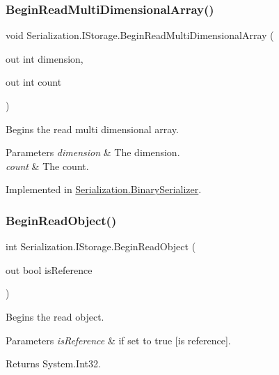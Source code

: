 \subsubsection{\texorpdfstring{Begin\+Read\+Multi\+Dimensional\+Array()}{BeginReadMultiDimensionalArray()}}
{\footnotesize\ttfamily void Serialization.\+I\+Storage.\+Begin\+Read\+Multi\+Dimensional\+Array (\begin{DoxyParamCaption}\item[{out int}]{dimension,  }\item[{out int}]{count }\end{DoxyParamCaption})}



Begins the read multi dimensional array. 


\begin{DoxyParams}{Parameters}
{\em dimension} & The dimension.\\
\hline
{\em count} & The count.\\
\hline
\end{DoxyParams}


Implemented in \hyperlink{class_serialization_1_1_binary_serializer_ac4d785eb39bba193195761ff9bacd98c}{Serialization.\+Binary\+Serializer}.

\mbox{\label{interface_serialization_1_1_i_storage_a2178c0c68457e13a45fa7e80fa345037}} 
\subsubsection{\texorpdfstring{Begin\+Read\+Object()}{BeginReadObject()}}
{\footnotesize\ttfamily int Serialization.\+I\+Storage.\+Begin\+Read\+Object (\begin{DoxyParamCaption}\item[{out bool}]{is\+Reference }\end{DoxyParamCaption})}



Begins the read object. 


\begin{DoxyParams}{Parameters}
{\em is\+Reference} & if set to {\ttfamily true} \mbox{[}is reference\mbox{]}.\\
\hline
\end{DoxyParams}
\begin{DoxyReturn}{Returns}
System.\+Int32.
\end{DoxyReturn}


